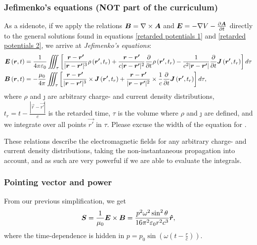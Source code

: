     \subsubsection*{Jefimenko's equations (NOT part of the curriculum)}
        As a sidenote, if we apply the relations $\bm{B} = \nabla\times\bm{A}$ and $\bm{E} = -\nabla V - \frac{\partial\bm{A}}{\partial t}$
        directly to the general solutions found in equations \eqref{retarded potentials 1} and \eqref{retarded potentials 2}, we arrive at 
        \textit{Jefimenko's equations}:
        \begin{align*}
            \bm{E}\left(\bm{r}, t\right) &= \frac{1}{4\pi\varepsilon_0}\iiint_\tau \left[
                \frac{\bm{r} - \bm{r'}}{|\bm{r} - \bm{r'}|^3}\rho\left(\bm{r'}, t_r\right)
                + \frac{\bm{r} - \bm{r'}}{c|\bm{r} - \bm{r'}|^2}\frac{\partial}{\partial t}\rho\left(\bm{r'}, t_r\right)
                - \frac{1}{c^2|\bm{r} - \bm{r'}|} \frac{\partial}{\partial t}\bm{J}\left(\bm{r'}, t_r\right)
                \right]d\tau \\
            \bm{B}\left(\bm{r}, t\right) &= -\frac{\mu_0}{4\pi} \iiint_\tau \left[
                \frac{\bm{r} - \bm{r'}}{|\bm{r} - \bm{r'}|^3} \times \bm{J}\left(\bm{r'}, t_r\right)
                + \frac{\bm{r} - \bm{r'}}{|\bm{r} - \bm{r'}|^2} \times \frac{1}{c}\frac{\partial}{\partial t}\bm{J}\left(\bm{r'}, t_r\right)
                \right]d\tau,
        \end{align*}
        where $\rho$ and \j{} are arbitrary charge- and current density distributions, 
        $t_r = t - \frac{|\vec{r} - \vec{r'}|}{c}$ is the retarded time,
        $\tau$ is the volume where $\rho$ and \j{} are defined, 
        and we integrate over all points $\vec{r'}$ in $\tau$. 
        Please excuse the width of the equation for \E{}.

        These relations describe the electromagnetic fields for any arbitrary charge- and current density distributions, 
        taking the non-instantaneous propagation into account,
        and as such are very powerful if we are able to evaluate the integrals.
    
    \subsubsection*{Pointing vector and power}
        From our previous simplification, we get
        \begin{equation}
            \vec{S} = \frac{1}{\mu_0}\E\times\B = \frac{p^2\omega^2\sin^2\theta}{16\pi^2\e r^2 c^3}\hat{r},
        \end{equation}
        where the time-dependence is hidden in $p = p_0\sin\left(\omega\left(t - \frac{r}{c}\right)\right)$.
    
